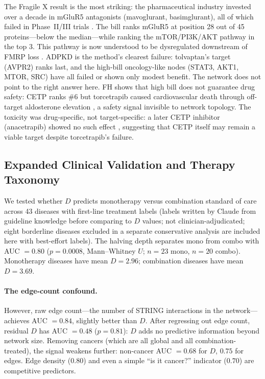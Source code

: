 \documentclass[11pt,a4paper]{article}
\begin{document}
The Fragile X result is the most striking: the pharmaceutical industry invested over a decade in mGluR5 antagonists (mavoglurant, basimglurant), all of which failed in Phase~II/III trials \citep{bear2004,berrykravis2016}. The bill ranks mGluR5 at position 28 out of 45 proteins---below the median---while ranking the mTOR/PI3K/AKT pathway in the top 3. This pathway is now understood to be dysregulated downstream of FMRP loss \citep{sharma2010}. ADPKD is the method's clearest failure: tolvaptan's target (AVPR2) ranks last, and the high-bill oncology-like nodes (STAT3, AKT1, MTOR, SRC) have all failed or shown only modest benefit. The network does not point to the right answer here. FH shows that high bill does not guarantee drug safety: CETP ranks \#6 but torcetrapib caused cardiovascular death through off-target aldosterone elevation \citep{barter2007}, a safety signal invisible to network topology. The toxicity was drug-specific, not target-specific: a later CETP inhibitor (anacetrapib) showed no such effect \citep{reveal2017}, suggesting that CETP itself may remain a viable target despite torcetrapib's failure.

\subsection{Expanded Clinical Validation and Therapy Taxonomy}

We tested whether $D$ predicts monotherapy versus combination standard of care across 43 diseases with first-line treatment labels (labels written by Claude from guideline knowledge before comparing to $D$ values; not clinician-adjudicated; eight borderline diseases excluded in a separate conservative analysis are included here with best-effort labels). The halving depth separates mono from combo with AUC $= 0.80$ ($p = 0.0008$, Mann--Whitney $U$; $n = 23$ mono, $n = 20$ combo). Monotherapy diseases have mean $D = 2.96$; combination diseases have mean $D = 3.69$.

\paragraph{The edge-count confound.} However, raw edge count---the number of STRING interactions in the network---achieves AUC $= 0.84$, slightly better than $D$. After regressing out edge count, residual $D$ has AUC $= 0.48$ ($p = 0.81$): $D$ adds no predictive information beyond network size. Removing cancers (which are all global and all combination-treated), the signal weakens further: non-cancer AUC $= 0.68$ for $D$, $0.75$ for edges. Edge density ($0.80$) and even a simple ``is it cancer?'' indicator ($0.70$) are competitive predictors.
\end{document}
